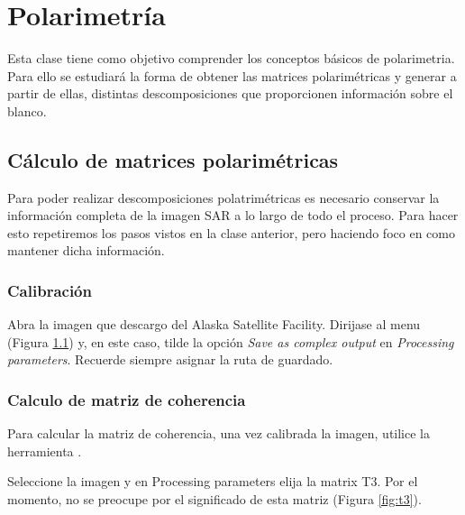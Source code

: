 \chapter{Polarimetría}

Esta clase tiene como objetivo comprender los conceptos básicos de polarimetria. Para ello se estudiará la forma de obtener las matrices polarimétricas y generar a partir de ellas, distintas descomposiciones que proporcionen información sobre el blanco.

\section{Cálculo de matrices polarimétricas}

Para poder realizar descomposiciones polatrimétricas es necesario conservar la información completa de la imagen SAR a lo largo de todo el proceso. Para hacer esto repetiremos los pasos vistos en la clase anterior, pero haciendo foco en como mantener dicha información.

\subsection{Calibración}
Abra la imagen  que descargo del Alaska Satellite Facility.  Dirijase al menu  (Figura \ref{fig:calibrar}) y, en este caso, tilde la opción \emph{Save as complex output} en \emph{Processing parameters}. Recuerde siempre asignar la ruta de guardado.

\begin{figure}[h!]
    \centering
    \hfill
    \caption{}
    \label{fig:calibrar}
\end{figure}

\subsection{Calculo de matriz de coherencia}

Para calcular la matriz de coherencia, una vez calibrada la imagen, utilice la herramienta .

Seleccione la imagen  y en Processing parameters elija la matrix T3. Por el momento, no se preocupe por el significado de esta matriz (Figura \ref{fig:t3}).

